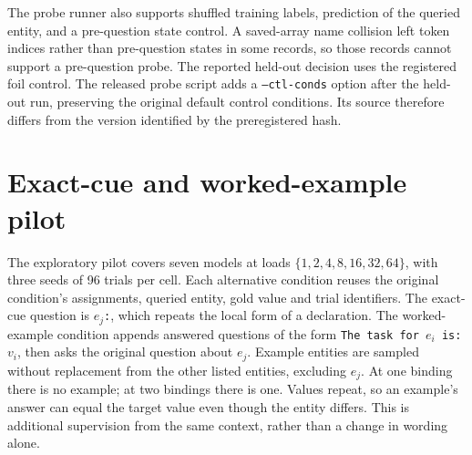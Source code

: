 \documentclass{article}
\begin{document}
\begin{table}[t]
\centering
\caption{Held-out-model results at sixteen bindings, three-quarter depth and 576 trials per cell.
Logit decoder: out-of-fold logistic regression on all candidate-value logits.
The interval uses 10{,}000 paired resamples of prompts, conditional on fitted predictions.
It does not include uncertainty from refitting probes or sampling training runs.
Distractor text is the secondary condition.}
\label{tab:heldout}
\footnotesize

\end{table}

The probe runner also supports shuffled training labels, prediction of the queried entity, and a pre-question state control.
A saved-array name collision left token indices rather than pre-question states in some records, so those records cannot support a pre-question probe.
The reported held-out decision uses the registered foil control.
The released probe script adds a \texttt{--ctl-conds} option after the held-out run, preserving the original default control conditions.
Its source therefore differs from the version identified by the preregistered hash.

\section{Exact-cue and worked-example pilot}\label{app:wording}
The exploratory pilot covers seven models at loads $\{1,2,4,8,16,32,64\}$, with three seeds of 96 trials per cell.
Each alternative condition reuses the original condition's assignments, queried entity, gold value and trial identifiers.
The exact-cue question is \texttt{$e_j$:}, which repeats the local form of a declaration.
The worked-example condition appends answered questions of the form \texttt{The task for $e_i$ is: $v_i$}, then asks the original question about $e_j$.
Example entities are sampled without replacement from the other listed entities, excluding $e_j$.
At one binding there is no example; at two bindings there is one.
Values repeat, so an example's answer can equal the target value even though the entity differs.
This is additional supervision from the same context, rather than a change in wording alone.

\begin{table}[t]
\centering
\caption{Native recall at sixteen bindings in the exploratory seven-model pilot, with 288 matched trials per condition and no distractors.
Exact cue asks \texttt{$e_j$:}; two examples provide labeled answers for other listed entities before the original question.
The original-query cells use the same three-seed subset of the main grid.
For models in both wording studies, the original-query trials are identical.}
\label{tab:wording-pilot}
\small

\end{table}
\end{document}
